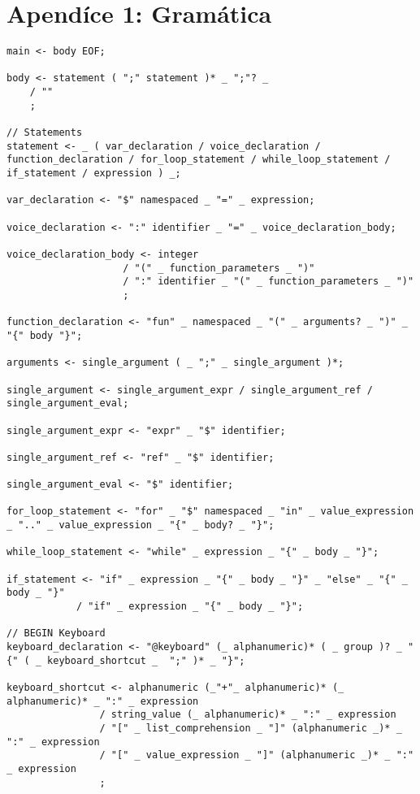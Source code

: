 \section{Apendíce 1: Gramática}
\label{grammar}
\begin{lstlisting}
main <- body EOF;

body <- statement ( ";" statement )* _ ";"? _
    / ""
    ;

// Statements
statement <- _ ( var_declaration / voice_declaration / function_declaration / for_loop_statement / while_loop_statement / if_statement / expression ) _;

var_declaration <- "$" namespaced _ "=" _ expression;

voice_declaration <- ":" identifier _ "=" _ voice_declaration_body;

voice_declaration_body <- integer
                    / "(" _ function_parameters _ ")"
                    / ":" identifier _ "(" _ function_parameters _ ")"
                    ;

function_declaration <- "fun" _ namespaced _ "(" _ arguments? _ ")" _ "{" body "}";

arguments <- single_argument ( _ ";" _ single_argument )*;

single_argument <- single_argument_expr / single_argument_ref / single_argument_eval;

single_argument_expr <- "expr" _ "$" identifier;

single_argument_ref <- "ref" _ "$" identifier;

single_argument_eval <- "$" identifier;

for_loop_statement <- "for" _ "$" namespaced _ "in" _ value_expression _ ".." _ value_expression _ "{" _ body? _ "}";

while_loop_statement <- "while" _ expression _ "{" _ body _ "}";

if_statement <- "if" _ expression _ "{" _ body _ "}" _ "else" _ "{" _ body _ "}"
            / "if" _ expression _ "{" _ body _ "}";

// BEGIN Keyboard
keyboard_declaration <- "@keyboard" (_ alphanumeric)* ( _ group )? _ "{" ( _ keyboard_shortcut _  ";" )* _ "}";

keyboard_shortcut <- alphanumeric (_"+"_ alphanumeric)* (_ alphanumeric)* _ ":" _ expression
                / string_value (_ alphanumeric)* _ ":" _ expression
                / "[" _ list_comprehension _ "]" (alphanumeric _)* _ ":" _ expression
                / "[" _ value_expression _ "]" (alphanumeric _)* _ ":" _ expression
                ;


\end{lstlisting}
